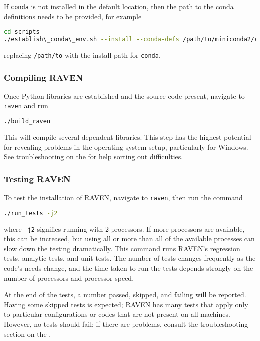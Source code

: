 \nb If \texttt{conda} is not installed in the default location, then the path to the conda definitions
needs to be provided, for example
\begin{lstlisting}[language=bash]
cd scripts
./establish\_conda\_env.sh --install --conda-defs /path/to/miniconda2/etc/profile.d/conda.sh
\end{lstlisting}
replacing \texttt{/path/to} with the install path for \texttt{conda}.




\subsubsection{Compiling RAVEN}
Once Python libraries are established and the source code present, navigate to \texttt{raven} and run
\begin{lstlisting}[language=bash]
./build_raven
\end{lstlisting}
This will compile several dependent libraries.  This step has the highest potential for revealing problems in
the operating system setup, particularly for Windows.  See troubleshooting on the \wiki for help sorting out
difficulties.




\subsubsection{Testing RAVEN}
\label{sec:testing raven}
To test the installation of RAVEN, navigate to \texttt{raven}, then run the command
\begin{lstlisting}[language=bash]
./run_tests -j2
\end{lstlisting}
where \texttt{-j2} signifies running with 2 processors.  If more processors are available, this can be
increased, but using all or more than all of the available processes can slow down the testing dramatically.
This command runs RAVEN's regression tests, analytic tests, and unit tests.  The number of tests changes
frequently as the code's needs change, and the time taken to run the tests depends strongly on the number of
processors and processor speed.

At the end of the tests, a number passed, skipped, and failing will be reported.  Having some skipped tests is
expected; RAVEN has many tests that apply only to particular configurations or codes that are not present on
all machines.  However, no tests should fail; if there are problems, consult the troubleshooting section on
the \wiki.


